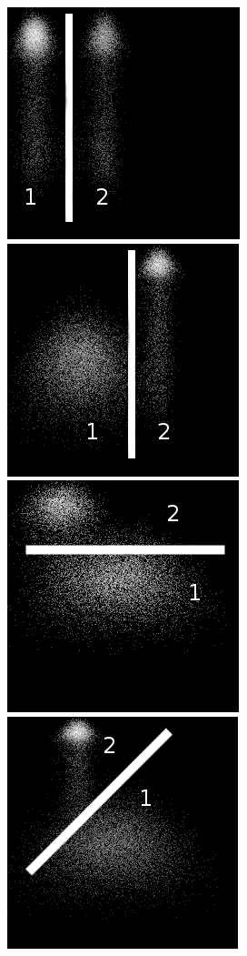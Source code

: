 \documentclass[a4paper,12pt]{report}
\begin{document}
\begin{figure}[htp]
  \centering
	\includegraphics[scale=0.35]{image/hd01.png}
	\includegraphics[scale=0.35]{image/hd11.png}
	\includegraphics[scale=0.35]{image/hd21.png}
	\includegraphics[scale=0.35]{image/hd31.png}

\end{figure}
\end{document}
